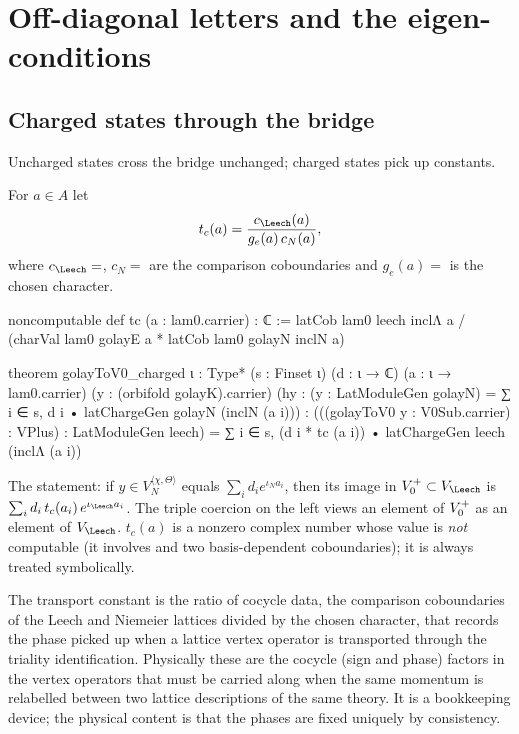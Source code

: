 \section{Off-diagonal letters and the eigen-conditions}\label{ch13:sec:offdiag}

\subsection{Charged states through the bridge}
Uncharged states cross the bridge  unchanged; charged states pick up constants.
\begin{definition}\label{ch13:def:tc}
For $a\in A$ let
\begin{equation*}
  t_c(a)=\frac{c_\Leech(a)}{g_e(a)\,c_N(a)},
\end{equation*}
where $c_\Leech=$, $c_N=$ are the comparison
coboundaries and $g_e(a)=$ is the chosen character.
\end{definition}
\begin{leancode}
noncomputable def tc (a : lam0.carrier) : ℂ :=
  latCob lam0 leech inclΛ a / (charVal lam0 golayE a * latCob lam0 golayN inclN a)

theorem golayToV0_charged {ι : Type*} (s : Finset ι) (d : ι → ℂ) (a : ι → lam0.carrier)
    (y : (orbifold golayK).carrier)
    (hy : (y : LatModuleGen golayN) = ∑ i ∈ s, d i • latChargeGen golayN (inclN (a i))) :
    (((golayToV0 y : V0Sub.carrier) : VPlus) : LatModuleGen leech)
      = ∑ i ∈ s, (d i * tc (a i)) • latChargeGen leech (inclΛ (a i))
\end{leancode}
\begin{dictionary}
The statement: if $y\in V_N^{\langle\chi,\Theta\rangle}$ equals $\sum_id_ie^{\iota_N a_i}$, then its image in
$\chthirteenV\subset V_\Leech$ is $\sum_i d_i\,t_c(a_i)\,e^{\iota_\Leech a_i}$. The triple coercion on the left
views an element of $V_0^{+}$ as an element of $V_\Leech$. $t_c(a)$ is a nonzero complex number whose
value is \emph{not} computable (it involves  and two basis-dependent coboundaries); it is
always treated symbolically.
\end{dictionary}
\begin{physics}
The transport constant is the ratio of cocycle data, the comparison coboundaries of the Leech and Niemeier lattices divided by the chosen character, that records the phase picked up when a lattice vertex operator is transported through the triality identification. Physically these are the cocycle (sign and phase) factors in the vertex operators that must be carried along when the same momentum is relabelled between two lattice descriptions of the same theory. It is a bookkeeping device; the physical content is that the phases are fixed uniquely by consistency.
\end{physics}
